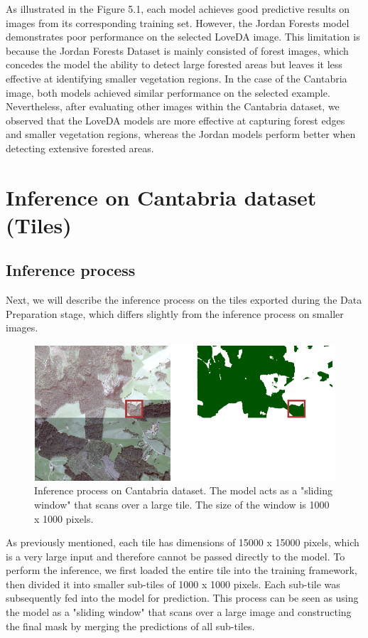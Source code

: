 As illustrated in the Figure 5.1, each model achieves good predictive results on images from its corresponding training set. However, the Jordan Forests model demonstrates poor performance on the selected LoveDA image. This limitation is because the Jordan Forests Dataset is mainly consisted of forest images, which concedes the model the ability to detect large forested areas but leaves it less effective at identifying smaller vegetation regions. In the case of the Cantabria image, both models achieved similar performance on the selected example. Nevertheless, after evaluating other images within the Cantabria dataset, we observed that the LoveDA models are more effective at capturing forest edges and smaller vegetation regions, whereas the Jordan models perform better when detecting extensive forested areas. 

\section{Inference on Cantabria dataset (Tiles)}
\subsection{Inference process}
Next, we will describe the inference process on the tiles exported during the Data Preparation stage, which differs slightly from the inference process on smaller images.


\begin{figure}[H]
 \centering
 \includegraphics[scale=0.75]{IMAGENES/IMG17-Inference-process.png}
 \captionsetup{font=large}
 \caption {Inference process on Cantabria dataset. The model acts as a "sliding window" that scans over a large tile. The size of the window is 1000 x 1000 pixels.}
\end{figure}

 As previously mentioned, each tile has dimensions of 15000 x 15000 pixels, which is a very large input and therefore cannot be passed directly to the model. To perform the inference, we first loaded the entire tile into the training framework, then divided it into smaller sub-tiles of 1000 x 1000 pixels. Each sub-tile was subsequently fed into the model for prediction.  This process can be seen as using the model as a "sliding window" that scans over a large image and constructing the final mask by merging the predictions of all sub-tiles. 

